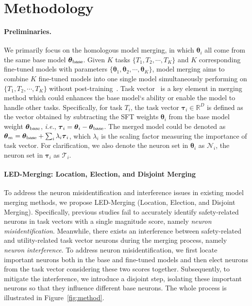 

\section{Methodology}
\paragraph{Preliminaries.}
We primarily focus on the homologous model merging, in which $\boldsymbol{\theta}_i$ all come from the same base model $\boldsymbol{\theta}_{\rm{base}}$. Given $K$ tasks $\{T_1,T_2,\cdots,T_K\}$ and $K$ corresponding fine-tuned models with parameters $\{\boldsymbol{\theta}_1,\boldsymbol{\theta}_2,\cdots,\boldsymbol{\theta}_K\}$, model merging aims to combine $K$ fine-tuned models into one single model simultaneously performing on $\{T_1,T_2,\cdots,T_K\}$ without post-training~\cite{method_p1_1,method_p1_2}.
Task vector~\cite{ilharco2023editing,yang2024adamerging} is a key element in merging method which could enhances the base model‘s ability or enable the model to handle other tasks. Specifically, for task $T_i$, the task vector $\boldsymbol\tau_i\in \mathbb{R}^D$ is defined as the vector obtained by subtracting the SFT weights $\boldsymbol{\theta}_i$ from the base model weight
$\boldsymbol{\theta}_{\rm{base}}$, \emph{i.e.}, $\boldsymbol\tau_i=\boldsymbol{\theta}_i-\boldsymbol{\theta}_{\rm{base}}$. The merged model could be denoted as $\boldsymbol{\theta}_m=\boldsymbol{\theta}_{\rm{base}}+\sum_i \lambda_i\boldsymbol{\tau}_i$, which $\lambda_i$ is the scaling factor measuring the importance of task vector. For clarification, we also denote the neuron set in $\boldsymbol{\theta}_i$ as $\mathcal{N}_i$, the neuron set in $\boldsymbol{\tau}_i$ as $\mathcal{T}_i$.





\paragraph{LED-Merging: Location, Election, and Disjoint Merging}
To address the neuron misidentification and interference issues in existing model merging methods, we propose LED-Merging (Location, Election, and Disjoint Merging). Specifically, previous studies \cite{modelstock, ilharco2023editing, tiesmerging} fail to accurately identify safety-related neurons in task vectors with a single magnitude score, namely \textit{neuron misidentification}. Meanwhile, there exists an interference between safety-related and utility-related task vector neurons during the merging process, namely \textit{neuron interference}. To address neuron misidentification, we first locate important neurons both in the base and fine-tuned models and then elect neurons from the task vector considering these two scores together. Subsequently, to mitigate the interference, we introduce a disjoint step, isolating these important neurons so that they influence different base neurons. The whole process is illustrated in Figure~\ref{fig:method}. 




